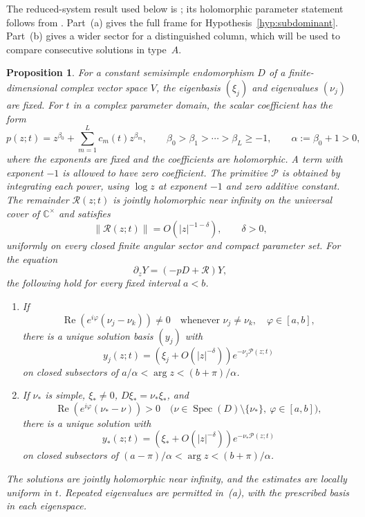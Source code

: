 \documentclass[11pt,leqno]{amsart}
\numberwithin{equation}{section}
\theoremstyle{plain}
\newtheorem{proposition}[theorem]{Proposition}
\theoremstyle{definition}
\theoremstyle{plain}
\theoremstyle{definition}
\theoremstyle{remark}
\begin{document}
The reduced-system result used below is \cite[Theorem~3.26]{CGM2025}; its holomorphic parameter statement follows from \cite[Theorems~2.21, 2.27 and Corollaries~2.22, 2.28]{CGM2025}.  Part~(a) gives the full frame for Hypothesis~\ref{hyp:subdominant}.  Part~(b) gives a wider sector for a distinguished column, which will be used to compare consecutive solutions in type~$A$.
\begin{proposition}\label{prop:sectorial-reduced-system-input}
For a constant semisimple endomorphism $D$ of a finite-dimensional complex vector space $V$, the eigenbasis $(\xi_j)$ and eigenvalues $(\nu_j)$ are fixed.  For $t$ in a complex parameter domain, the scalar coefficient has the form
\[
 p(z;t)=z^{\beta_0}+\sum_{m=1}^{L}c_m(t)z^{\beta_m},
 \qquad \beta_0>\beta_1>\cdots>\beta_L\ge-1,
 \qquad \alpha:=\beta_0+1>0,
\]
where the exponents are fixed and the coefficients are holomorphic.  A term with exponent $-1$ is allowed to have zero coefficient.  The primitive $\mathcal P$ is obtained by integrating each power, using $\log z$ at exponent $-1$ and zero additive constant.  The remainder $\mathcal R(z;t)$ is jointly holomorphic near infinity on the universal cover of $\mathbb C^\times$ and satisfies
\[
 \|\mathcal R(z;t)\|=O(|z|^{-1-\delta}),\qquad \delta>0,
\]
uniformly on every closed finite angular sector and compact parameter set.  For the equation
\[
 \partial_zY=(-pD+\mathcal R)Y,
\]
the following hold for every fixed interval $a<b$.
\begin{enumerate}[label=(\alph*),topsep=3pt,itemsep=2pt]
\item If
\[
 \operatorname{Re}(e^{i\varphi}(\nu_j-\nu_k))\ne0
 \quad\text{whenever }\nu_j\ne\nu_k,\quad \varphi\in[a,b],
\]
there is a unique solution basis $(y_j)$ with
\[
 y_j(z;t)=(\xi_j+O(|z|^{-\delta}))e^{-\nu_j\mathcal P(z;t)}
\]
on closed subsectors of $a/\alpha<\arg z<(b+\pi)/\alpha$.
\item If $\nu_*$ is simple, $\xi_*\ne0$, $D\xi_*=\nu_*\xi_*$, and
\[
 \operatorname{Re}(e^{i\varphi}(\nu_*-\nu))>0
 \quad\bigl(\nu\in\operatorname{Spec}(D)\setminus\{\nu_*\},\ \varphi\in[a,b]\bigr),
\]
there is a unique solution with
\[
 y_*(z;t)=(\xi_*+O(|z|^{-\delta}))e^{-\nu_*\mathcal P(z;t)}
\]
on closed subsectors of $(a-\pi)/\alpha<\arg z<(b+\pi)/\alpha$.
\end{enumerate}
The solutions are jointly holomorphic near infinity, and the estimates are locally uniform in $t$.  Repeated eigenvalues are permitted in~(a), with the prescribed basis in each eigenspace.
\end{proposition}
\end{document}
